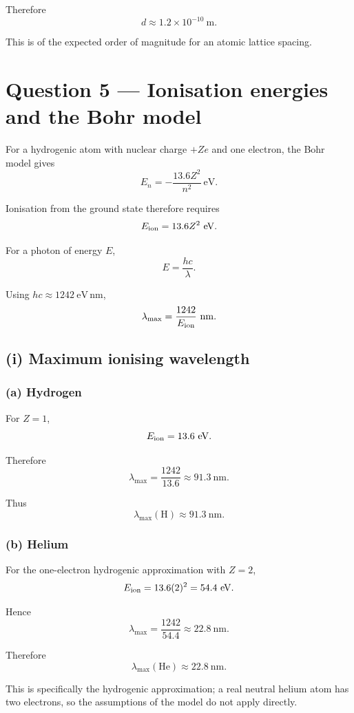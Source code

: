\documentclass[11pt,a4paper]{article}
\begin{document}
Therefore
\[
\boxed{d\approx1.2\times10^{-10}\ \mathrm m}.
\]

This is of the expected order of magnitude for an atomic lattice spacing.

\section{Question 5 --- Ionisation energies and the Bohr model}

For a hydrogenic atom with nuclear charge $+Ze$ and one electron, the Bohr model
gives
\[
E_n=-\frac{13.6Z^2}{n^2}\ \mathrm{eV}.
\]

Ionisation from the ground state therefore requires
\[
E_{\rm ion}=13.6Z^2\ \mathrm{eV}.
\]

For a photon of energy $E$,
\[
E=\frac{hc}{\lambda}.
\]

Using $hc\approx1242\ \mathrm{eV\,nm}$,
\[
\lambda_{\max}
=
\frac{1242}{E_{\rm ion}}\ \mathrm{nm}.
\]

\subsection{(i) Maximum ionising wavelength}

\subsubsection*{(a) Hydrogen}

For $Z=1$,
\[
E_{\rm ion}=13.6\ \mathrm{eV}.
\]

Therefore
\[
\lambda_{\max}
=
\frac{1242}{13.6}
\approx91.3\ \mathrm{nm}.
\]

Thus
\[
\boxed{\lambda_{\max}(\mathrm H)\approx91.3\ \mathrm{nm}}.
\]

\subsubsection*{(b) Helium}

For the one-electron hydrogenic approximation with $Z=2$,
\[
E_{\rm ion}=13.6(2)^2
=54.4\ \mathrm{eV}.
\]

Hence
\[
\lambda_{\max}
=
\frac{1242}{54.4}
\approx22.8\ \mathrm{nm}.
\]

Therefore
\[
\boxed{\lambda_{\max}(\mathrm{He})\approx22.8\ \mathrm{nm}}.
\]

This is specifically the hydrogenic approximation; a real neutral helium atom has
two electrons, so the assumptions of the model do not apply directly.
\end{document}
